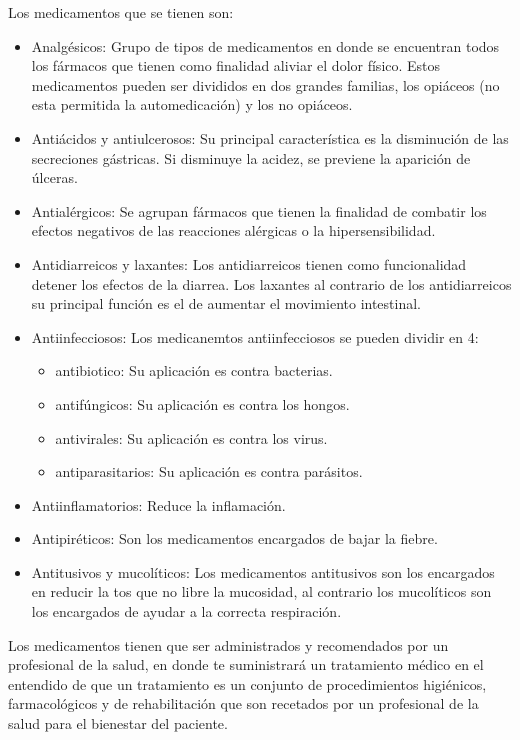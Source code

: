 Los medicamentos que se tienen son\cite{Referencia4}:
\begin{itemize}
	\item Analgésicos: Grupo de tipos de medicamentos en donde se encuentran todos los fármacos que tienen como finalidad aliviar el dolor físico. Estos medicamentos pueden ser divididos en dos grandes familias, los opiáceos (no esta permitida la automedicación) y los no opiáceos.
		
	\item Antiácidos y antiulcerosos: Su principal característica es la disminución de las secreciones gástricas. Si disminuye la acidez, se previene la aparición de úlceras.
	
	\item Antialérgicos: Se agrupan fármacos que tienen la finalidad de combatir los efectos negativos de las reacciones alérgicas o la hipersensibilidad.
	
	\item Antidiarreicos y laxantes: Los antidiarreicos tienen como funcionalidad detener los efectos de la diarrea. Los laxantes al contrario de los antidiarreicos su principal función es el de aumentar el movimiento intestinal.
	
	\item Antiinfecciosos: Los medicanemtos antiinfecciosos se pueden dividir en 4:
		\begin{itemize}
			\item antibiotico: Su aplicación es contra bacterias.
			\item antifúngicos: Su aplicación es contra los hongos.
			\item antivirales: Su aplicación es contra los virus.
			\item antiparasitarios: Su aplicación es contra parásitos.
		\end{itemize}
	
	\item Antiinflamatorios: Reduce la inflamación.
	
	\item Antipiréticos: Son los medicamentos encargados de bajar la fiebre.
	
	\item Antitusivos y mucolíticos: Los medicamentos antitusivos son los encargados en reducir la tos que no libre la mucosidad, al contrario los mucolíticos son los encargados de ayudar a la correcta respiración.
	 
\end{itemize}
Los medicamentos tienen que ser administrados y recomendados por un profesional de la salud, en donde te suministrará un tratamiento médico en el entendido de que un tratamiento es un conjunto de procedimientos higiénicos, farmacológicos y de rehabilitación que son recetados por un profesional de la salud para el bienestar del paciente. 

